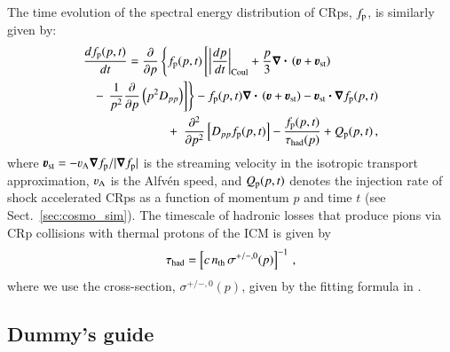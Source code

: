 \documentclass[fleqn,usenatbib,useAMS]{mnras}
\newcommand{\bcdot}{\ensuremath{%
  \mathchoice%
   {\mskip\thinmuskip\lower0.2ex\hbox{\scalebox{1.5}{$\cdot$}}\mskip\thinmuskip}}%
   {\mskip\thinmuskip\lower0.2ex\hbox{\scalebox{1.5}{$\cdot$}}\mskip\thinmuskip}%
   {\lower0.3ex\hbox{\scalebox{1.2}{$\cdot$}}}%
   {\lower0.3ex\hbox{\scalebox{1.2}{$\cdot$}}}%
}
\newcommand{\bvel}{\ensuremath{\boldsymbol{\varv}}}
\newcommand{\bnabla}{\ensuremath{\boldsymbol{\nabla}}}
\begin{document}
The time evolution of the spectral energy distribution of CRps,
$f_{{\mathrm{p}}}$, is similarly given by:
\begin{eqnarray}
\lefteqn{
  {{d f_{\rmn{p}}(p,t)}\over{d t}} =
  {{\partial }\over{\partial p}}
  \left\{
  f_{\rmn{p}}(p,t)\left[ \left|{{dp}\over{dt}}\right|_{\rm Coul}
    + \frac{p}{3}\bnabla\bcdot \left(\bvel+\bvel_{\rmn{st}}\right)\right.\right.}
\nonumber\\
&&-\left.\left. {1\over{p^2}}{{\partial }\over{\partial p}}\left(p^2 D_{pp}\right)
\right]\right\} - f_{\rmn{p}}(p,t) \bnabla\bcdot \left(\bvel+\bvel_{\rmn{st}}\right) 
- \bvel_{\rmn{st}}\bcdot\bnabla f_{\rmn{p}}(p,t)
\nonumber\\
&&+\,\,\, {{\partial^2 }\over{\partial p^2}}
\left[ D_{pp} f_{\rmn{p}}(p,t) \right] - {{f_{\rmn{p}}(p,t)}\over{\tau_{\rm had}(p)}}
+ Q_{\rmn{p}}(p,t)\, ,
\label{eq:FP_p}
\end{eqnarray}
where $\bvel_{\rmn{st}}=-\varv_{\rmn{A}}\bnabla f_{\rmn{p}}/|\bnabla
f_{\rmn{p}}|$ is the streaming velocity in the isotropic transport
approximation, $\varv_{\rmn{A}}$ is the Alfv\'en speed,
and $Q_{{\mathrm{p}}}(p,t)$ denotes the injection rate of shock accelerated
CRps as a function of momentum $p$ and time $t$ (see
Sect.~\ref{sec:cosmo_sim}). The timescale of
hadronic losses that produce pions via CRp collisions with thermal
protons of the ICM is given by 
\begin{eqnarray}
  \tau_{\rm had} = \left[c\,n_{\mathrm{th}}\,\sigma^{+/-,0}(p)\right]^{-1}\,,
\end{eqnarray}
where we use the cross-section, $\sigma^{+/-,0}(p)$, given by the
fitting formula in \citep{1986ApJ...307...47D}.

\subsection{Dummy's guide} 
\label{sec:dummy} 
\end{document}
